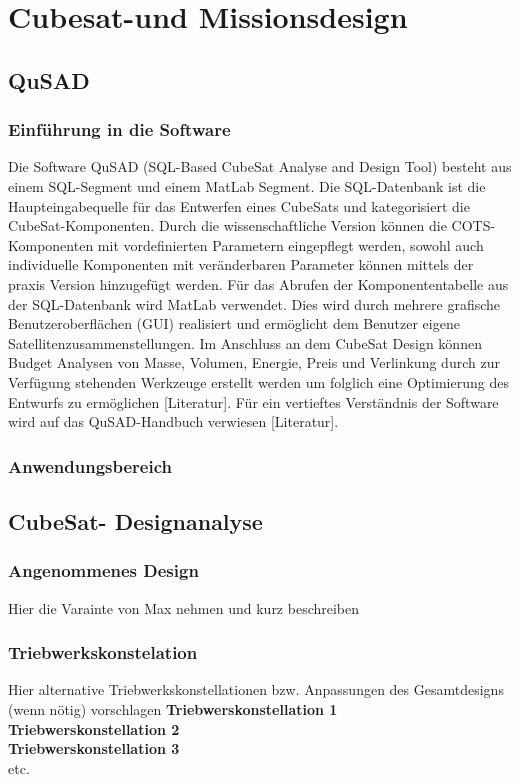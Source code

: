 \chapter{Cubesat-und Missionsdesign}
		\section{QuSAD}
			\subsection{Einführung in die Software}
Die Software QuSAD (SQL-Based CubeSat Analyse and Design Tool) besteht aus einem SQL-Segment und einem MatLab Segment. Die SQL-Datenbank ist die Haupteingabequelle für das Entwerfen eines CubeSats und kategorisiert die CubeSat-Komponenten. Durch die wissenschaftliche Version können die COTS-Komponenten mit vordefinierten Parametern eingepflegt werden, sowohl auch individuelle Komponenten mit veränderbaren Parameter können mittels der praxis Version hinzugefügt werden. Für das Abrufen der Komponententabelle aus der SQL-Datenbank wird MatLab verwendet. Dies wird durch mehrere grafische Benutzeroberflächen (GUI) realisiert und ermöglicht dem Benutzer eigene Satellitenzusammenstellungen. Im Anschluss an dem CubeSat Design können Budget Analysen von Masse, Volumen, Energie, Preis und Verlinkung durch zur Verfügung stehenden Werkzeuge erstellt werden um folglich eine Optimierung des Entwurfs zu ermöglichen [Literatur]. Für ein vertieftes Verständnis der Software wird auf das QuSAD-Handbuch verwiesen [Literatur].
 
				\subsection{Anwendungsbereich}
		\section{CubeSat- Designanalyse}
				\subsection{Angenommenes Design}
						Hier die Varainte von Max nehmen und kurz beschreiben
				\subsection{Triebwerkskonstelation}
				Hier alternative Triebwerkskonstellationen bzw. Anpassungen des Gesamtdesigns (wenn nötig) vorschlagen
								\textbf{Triebwerskonstellation 1}\\
								\textbf{Triebwerskonstellation 2}\\
								\textbf{Triebwerskonstellation 3}\\
								 etc.
